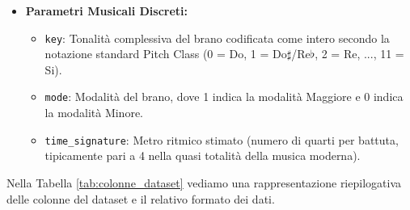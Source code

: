 \documentclass[12pt,a4paper]{article}
\begin{document}
\begin{itemize}
\begin{itemize}
        \item \texttt{liveness}: Valore tra 0.0 e 1.0 che rileva la presenza di un pubblico nella registrazione; valori superiori a 0.8 indicano un'alta probabilità di performance dal vivo.
        \item \texttt{valence}: Valore da 0.0 a 1.0 che descrive la positività musicale trasmessa dalla traccia: valori alti indicano euforia, allegria e serenità, mentre valori bassi denotano tristezza, rabbia o tensione emotiva.
        \item \texttt{tempo}: Velocità stimata del brano espressa in battiti al minuto (BPM).
        \item \texttt{duration\_ms}: Durata temporale complessiva del brano espressa in millisecondi.
    \end{itemize}
    \item \textbf{Parametri Musicali Discreti:}
    \begin{itemize}
        \item \texttt{key}: Tonalità complessiva del brano codificata come intero secondo la notazione standard Pitch Class (0 = Do, 1 = Do$\sharp$/Re$\flat$, 2 = Re, ..., 11 = Si).
        \item \texttt{mode}: Modalità del brano, dove 1 indica la modalità Maggiore e 0 indica la modalità Minore.
        \item \texttt{time\_signature}: Metro ritmico stimato (numero di quarti per battuta, tipicamente pari a 4 nella quasi totalità della musica moderna).
    \end{itemize}
\end{itemize}

Nella Tabella \ref{tab:colonne_dataset} vediamo una rappresentazione riepilogativa delle colonne del dataset e il relativo formato dei dati.
\end{document}
